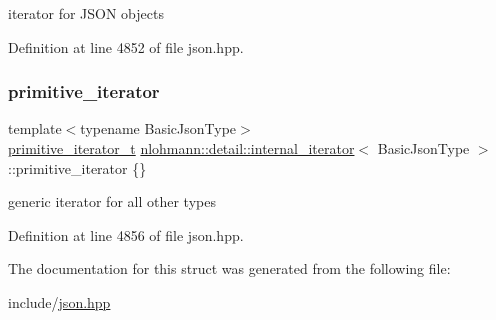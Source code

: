 iterator for J\+S\+ON objects 



Definition at line 4852 of file json.\+hpp.

\mbox{\label{structnlohmann_1_1detail_1_1internal__iterator_a2b3bb45f968210e42c282017eeeb63a8}} 
\subsubsection{\texorpdfstring{primitive\+\_\+iterator}{primitive\_iterator}}
{\footnotesize\ttfamily template$<$typename Basic\+Json\+Type$>$ \\
\hyperlink{classnlohmann_1_1detail_1_1primitive__iterator__t}{primitive\+\_\+iterator\+\_\+t} \hyperlink{structnlohmann_1_1detail_1_1internal__iterator}{nlohmann\+::detail\+::internal\+\_\+iterator}$<$ Basic\+Json\+Type $>$\+::primitive\+\_\+iterator \{\}}



generic iterator for all other types 



Definition at line 4856 of file json.\+hpp.



The documentation for this struct was generated from the following file\+:\begin{DoxyCompactItemize}
\item 
include/\hyperlink{json_8hpp}{json.\+hpp}\end{DoxyCompactItemize}
